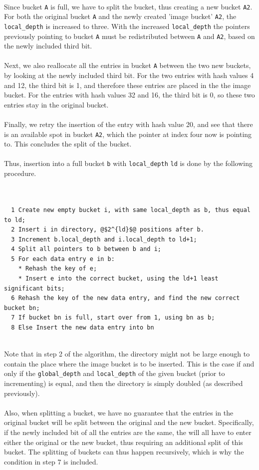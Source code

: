\documentclass[11pt]{report} %
\begin{document}
\\
Since bucket \verb|A| is full, we have to split the bucket, thus creating a new bucket \verb|A2|. For both the original bucket \verb|A| and the newly created 'image bucket' \verb|A2|, the \verb|local_depth| is increased to three. With the increased \verb|local_depth| the pointers previously pointing to bucket \verb|A| must be redistributed between \verb|A| and \verb|A2|, based on the newly included third bit. \\
\\
Next, we also reallocate all the entries in bucket \verb|A| between the two new buckets, by looking at the newly included third bit. For the two entries with hash values 4 and 12, the third bit is 1, and therefore these entries are placed in the the image bucket. For the entries with hash values 32 and 16, the third bit is 0, so these two entries stay in the original bucket. \\
\\
Finally, we retry the insertion of the entry with hash value 20, and see that there is an available spot in bucket \verb|A2|, which the pointer at index four now is pointing to. This concludes the split of the bucket.\\
\\
Thus, insertion into a full bucket \verb|b| with \verb|local_depth| \verb|ld| is done by the following procedure.\\
\\
\begin{fminipage}{\linewidth}
\begin{lstlisting}[escapechar=@]  % Start your code-block

  1 Create new empty bucket i, with same local_depth as b, thus equal to ld;
  2 Insert i in directory, @$2^{ld}$@ positions after b.
  3 Increment b.local_depth and i.local_depth to ld+1;
  4 Split all pointers to b between b and i;
  5 For each data entry e in b:
    * Rehash the key of e;
    * Insert e into the correct bucket, using the ld+1 least significant bits;
  6 Rehash the key of the new data entry, and find the new correct bucket bn;
  7 If bucket bn is full, start over from 1, using bn as b;
  8 Else Insert the new data entry into bn
\end{lstlisting}
\end{fminipage}
\vphantom{fill}\\
Note that in step 2 of the algorithm, the directory might not be large enough to contain the place where the image bucket is to be inserted. This is the case if and only if the \verb|global_depth| and \verb|local_depth| of the given bucket (prior to incrementing) is equal, and then the directory is simply doubled (as described previously). \\
\\
Also, when splitting a bucket, we have no guarantee that the entries in the original bucket will be split between the original and the new bucket. Specifically, if the newly included bit of all the entries are the same, the will all have to enter either the original or the new bucket, thus requiring an additional split of this bucket. The splitting of buckets can thus happen recursively, which is why the condition in step 7 is included.
\end{document}
